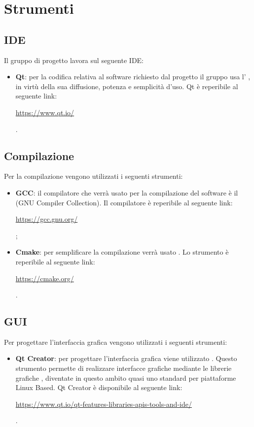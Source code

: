 

\section{Strumenti}

\subsection{IDE}

Il gruppo di progetto lavora sul seguente IDE:

\begin{itemize}
	\item \textbf{Qt}: per la codifica relativa al software richiesto dal progetto il gruppo usa l' , in virtù della sua diffusione, potenza e semplicità d'uso. Qt è reperibile al seguente link: \\ \centerline{\url{https://www.qt.io/}}.
\end{itemize}

\subsection{Compilazione}

Per la compilazione vengono utilizzati i seguenti strumenti:

\begin{itemize}
	\item \textbf{GCC}: il compilatore che verrà usato per la compilazione del software è il  (GNU Compiler Collection). Il compilatore è reperibile al seguente link: \\ \centerline{\url{https://gcc.gnu.org/}};
	
	\item \textbf{Cmake}: per semplificare la compilazione verrà usato . Lo strumento è reperibile al seguente link: \\ \centerline{\url{https://cmake.org/}}.
\end{itemize}

\subsection{GUI}

Per progettare l'interfaccia grafica vengono utilizzati i seguenti strumenti:

\begin{itemize}
	\item \textbf{Qt Creator}: per progettare l'interfaccia grafica viene utilizzato . Questo strumento permette di realizzare interfacce grafiche mediante le librerie grafiche , diventate in questo ambito quasi uno standard per piattaforme Linux Based. Qt Creator è disponibile al seguente link: \\  \centerline{\url{https://www.qt.io/qt-features-libraries-apis-tools-and-ide/}}. 
\end{itemize}

